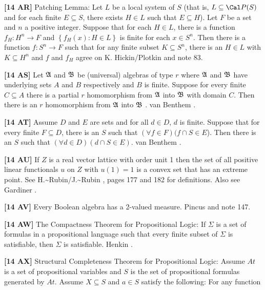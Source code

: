 \smallskip
\item{}{\bf [14 AR]}  Patching Lemma:  Let $L$ be a local system of $S$
(that is,  $L\subseteq\Cal P(S)$ and for each finite $E\subseteq S$,
there exists $H\in L$ such that $E\subseteq H$). Let $F$ be a set and
$n$ a positive integer. Suppose that for each $H\in L$, there is a
function $f_{H}: H^{n}\rightarrow F$ and $\left\{f_{H}(x): H\in L\right\}$
is finite for each $x\in S^{n}$. Then there is a function $f:
S^{n}\rightarrow F$ such that for any finite subset $K\subseteq S^{n}$,
there is an $H\in L$ with $K \subseteq H^{n}$ and $f$ and $f_{H}$ agree
on K. \ac{Hickin/Plotkin} \cite{1976} and note 83.
\smallskip
\item{}{\bf [14 AS]}  Let $\frak A$  and $\frak B$  be (universal)
algebras of type $r$ where  $\frak A$ and $\frak B$  have underlying
sets  $A$  and $B$  respectively  and $B$  is finite.  Suppose for
every finite $C \subseteq  A$ there is  a  partial $r$ homomorphism
from $\frak A$ into $\frak B$ with domain $C$.  Then there is  an $r$
homomorphism from $\frak A$ into $\frak B$ . van \ac{Benthem} \cite{1975}.
\smallskip
\item{}{\bf [14 AT]}  Assume $D$ and $E$ are sets and for all $d\in
D$, $d$  is finite.  Suppose that for every finite $F\subseteq D$, there
is an $S$ such that $(\forall f\in F)(f\cap S\in E$). Then there is an
$S$ such that $(\forall d\in D)(d\cap S\in E)$.  van \ac{Benthem}
\cite{1975}.
\smallskip
\item{}{\bf [14 AU]}  If $Z$ is a real vector lattice with order unit 1
then the set of all positive linear functionals $u$ on $Z$ with $u(1) =
1$ is a convex set that  has  an  extreme  point. See \ac{H.~Rubin/J.~Rubin}
\cite{1985}, pages 177 and 182 for definitions.   Also  see
\ac{Gardiner} \cite{1974}.
\smallskip
\item{}{\bf [14 AV]}  Every Boolean algebra has a 2-valued  measure.
\ac{Pincus} \cite{1972c} and note 147.
\smallskip
\item{}{\bf [14 AW]} The Compactness Theorem for Propositional Logic:
If $\Sigma$ is a set of formulas in a propositional language such that
every finite subset of $\Sigma$ is satisfiable, then $\Sigma$ is
satisfiable.  \ac{Henkin} \cite{1954b}.
\smallskip
\item{}{\bf [14 AX]} Structural Completeness Theorem for Propositional
Logic:  Assume $At$ is a set of propositional variables and $S$
is the set of propositional formulas generated by $At$.  Assume
$X\subseteq S$ and $a\in S$ satisfy the following:  For any function
